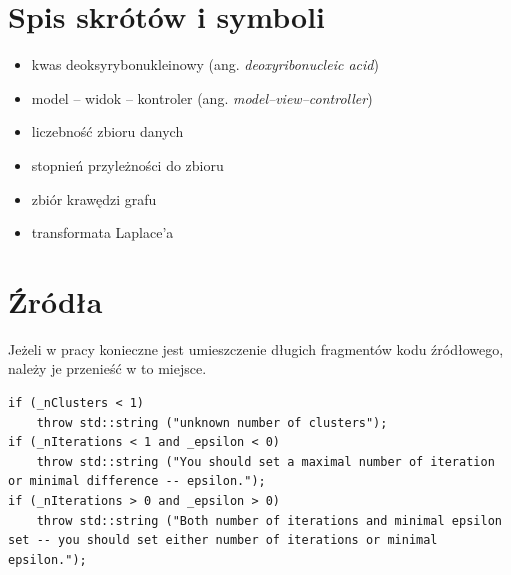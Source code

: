 \documentclass[a4paper,twoside,12pt]{book}
\newcommand{\obcy}[1]{\emph{#1}}
\newcommand{\english}[1]{{\selectlanguage{british}\obcy{#1}}}
\begin{document}
\begin{appendices}

\chapter{Spis skrótów i symboli}

\begin{itemize}
\item[DNA] kwas deoksyrybonukleinowy (ang. \english{deoxyribonucleic acid})
\item[MVC] model -- widok -- kontroler (ang. \english{model--view--controller}) 
\item[$N$] liczebność zbioru danych
\item[$\mu$] stopnień przyleżności do zbioru
\item[$\mathbb{E}$] zbiór krawędzi grafu
\item[$\mathcal{L}$] transformata Laplace'a 
\end{itemize}


\chapter{Źródła}

Jeżeli w pracy konieczne jest umieszczenie długich fragmentów kodu źródłowego, należy je przenieść w to miejsce.

\begin{lstlisting}
if (_nClusters < 1)
	throw std::string ("unknown number of clusters");
if (_nIterations < 1 and _epsilon < 0)
	throw std::string ("You should set a maximal number of iteration or minimal difference -- epsilon.");
if (_nIterations > 0 and _epsilon > 0)
	throw std::string ("Both number of iterations and minimal epsilon set -- you should set either number of iterations or minimal epsilon.");
\end{lstlisting}






\end{appendices}
\end{document}
